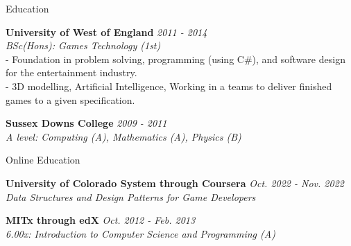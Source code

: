 \documentclass{resume} %
\begin{document}

\begin{rSection}{Education}

{\bf University of West of England } \hfill {\em 2011 - 2014} 
\\{ \textit {BSc(Hons): Games Technology (1st)  }} 
\\- Foundation in problem solving, programming (using C\#), and software design for the entertainment industry. 
\\- 3D modelling, Artificial Intelligence, Working in a teams to deliver finished games to a given specification.

{\bf Sussex Downs College} \hfill {\em 2009 - 2011} 
\\ { \textit {A level: Computing (A), Mathematics (A), Physics (B)}} \hfill


\end{rSection}

\begin{rSection}{Online Education}

{\bf University of Colorado System through Coursera} \hfill {\em Oct. 2022 - Nov. 2022} 
\\ { \textit {Data Structures and Design Patterns for Game Developers}}

{\bf MITx through edX} \hfill {\em Oct. 2012 - Feb. 2013} 
\\ { \textit {6.00x: Introduction to Computer Science and Programming (A)}}

\end{rSection}

\end{document}
